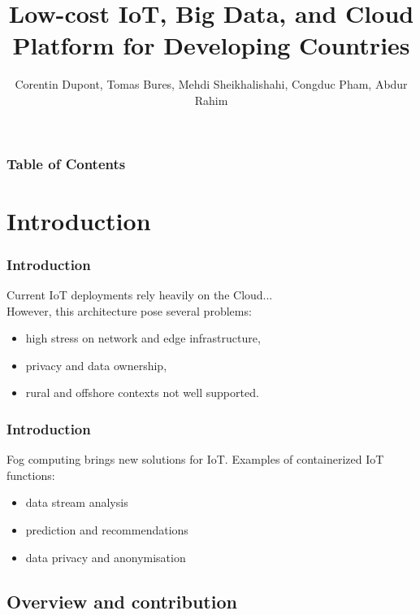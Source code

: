 \documentclass{beamer}
\begin{document}
\title{Low-cost IoT, Big Data, and Cloud Platform for Developing Countries}
\author{Corentin Dupont, Tomas Bures, Mehdi Sheikhalishahi, Congduc Pham, Abdur Rahim}		 



\maketitle

\begin{frame}
  \frametitle{Table of Contents}
  \tableofcontents[]
\end{frame}


\section{Introduction}
\begin{frame}
\frametitle{Introduction}
  
  Current IoT deployments rely heavily on the Cloud... \\
  However, this architecture pose several problems:
  \begin{itemize}
    \item high stress on network and edge infrastructure,
    \item privacy and data ownership,
    \item rural and offshore contexts not well supported.
  \end{itemize}

\end{frame}

\begin{frame}
\frametitle{Introduction}
  
  Fog computing brings new solutions for IoT.
  Examples of containerized IoT functions:
  \begin{itemize}
    \item data stream analysis
    \item prediction and recommendations
    \item data privacy and anonymisation
  \end{itemize}

\end{frame}

\subsection{Overview and contribution}
\end{document}
